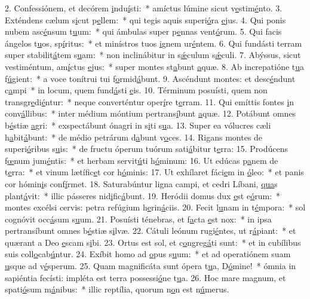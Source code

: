 2. Confessiónem, et decórem \uline{i}ndu\uline{í}sti:~* amíctus lúmine sicut v\uline{e}stim\uline{é}nto.
3. Exténdens cælum s\uline{i}cut p\uline{e}llem:~* qui tegis aquis superi\uline{ó}ra \uline{e}jus.
4. Qui ponis nubem asc\uline{é}nsum t\uline{u}um:~* qui ámbulas super p\uline{e}nnas vent\uline{ó}rum.
5. Qui facis ángelos t\uline{u}os, sp\uline{í}ritus:~* et minístros tuos \uline{i}gnem ur\uline{é}ntem.
6. Qui fundásti terram super stabilit\uline{á}tem s\uline{u}am:~* non inclinábitur in s\uline{ǽ}culum s\uline{ǽ}culi.
7. Abýssus, sicut vestiméntum, am\uline{í}ctus \uline{e}jus:~* super montes st\uline{a}bunt \uline{a}quæ.
8. Ab increpatióne t\uline{u}a f\uline{ú}gient:~* a voce tonítrui tui f\uline{o}rmid\uline{á}bunt.
9. Ascéndunt montes: et desc\uline{é}ndunt c\uline{a}mpi~* in locum, quem fund\uline{á}sti \uline{e}is.
10. Términum posuísti, quem non transgr\uline{e}di\uline{é}ntur:~* neque converténtur oper\uline{í}re t\uline{e}rram.
11. Qui emíttis fontes \uline{i}n conv\uline{á}llibus:~* inter médium móntium pertrans\uline{í}bunt \uline{a}quæ.
12. Potábunt omnes b\uline{é}stiæ \uline{a}gri:~* exspectábunt ónagri in s\uline{i}ti s\uline{u}a.
13. Super ea vólucres cæli h\uline{a}bit\uline{á}bunt:~* de médio petrárum d\uline{a}bunt v\uline{o}ces.
14. Rigans montes de superi\uline{ó}ribus s\uline{u}is:~* de fructu óperum tuórum sati\uline{á}bitur t\uline{e}rra:
15. Prodúcens f\uline{œ}num jum\uline{é}ntis:~* et herbam servit\uline{ú}ti h\uline{ó}minum:
16. Ut edúcas p\uline{a}nem de t\uline{e}rra:~* et vinum lætífic\uline{e}t cor h\uline{ó}minis:
17. Ut exhílaret fáci\uline{e}m in \uline{ó}leo:~* et panis cor hómin\uline{i}s conf\uline{í}rmet.
18. Saturabúntur ligna campi, et cedri Líbani, \uline{qua}s plant\uline{á}vit:~* illic pásseres nid\uline{i}fic\uline{á}bunt.
19. Heródii domus dux \uline{e}st e\uline{ó}rum:~* montes excélsi cervis: petra refúgium h\uline{e}rin\uline{á}ciis.
20. Fecit l\uline{u}nam in t\uline{é}mpora:~* sol cognóvit occ\uline{á}sum s\uline{u}um.
21. Posuísti ténebras, et f\uline{a}cta \uline{e}st nox:~* in ipsa pertransíbunt omnes b\uline{é}stiæ s\uline{i}lvæ.
22. Cátuli leónum rugi\uline{é}ntes, ut r\uline{á}piant:~* et quærant a Deo \uline{e}scam s\uline{i}bi.
23. Ortus est sol, et c\uline{o}ngreg\uline{á}ti sunt:~* et in cubílibus suis coll\uline{o}cab\uline{ú}ntur.
24. Exíbit homo ad \uline{o}pus s\uline{u}um:~* et ad operatiónem suam \uline{u}sque ad v\uline{é}sperum.
25. Quam magnificáta sunt ópera t\uline{u}a, D\uline{ó}mine!~* ómnia in sapiéntia fecísti: impléta est terra possessi\uline{ó}ne t\uline{u}a.
26. Hoc mare magnum, et spati\uline{ó}sum m\uline{á}nibus:~* illic reptília, quorum n\uline{o}n est n\uline{ú}merus.
